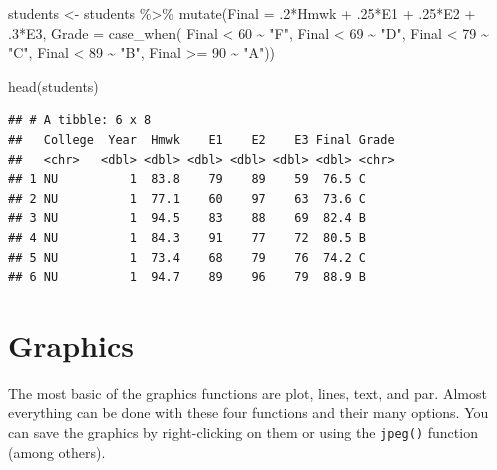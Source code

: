 \documentclass[
]{book}
\newenvironment{Shaded}{\begin{snugshade}}{\end{snugshade}}
\newcommand{\AttributeTok}[1]{\textcolor[rgb]{0.77,0.63,0.00}{#1}}
\newcommand{\DecValTok}[1]{\textcolor[rgb]{0.00,0.00,0.81}{#1}}
\newcommand{\FunctionTok}[1]{\textcolor[rgb]{0.00,0.00,0.00}{#1}}
\newcommand{\NormalTok}[1]{#1}
\newcommand{\OtherTok}[1]{\textcolor[rgb]{0.56,0.35,0.01}{#1}}
\newcommand{\SpecialCharTok}[1]{\textcolor[rgb]{0.00,0.00,0.00}{#1}}
\newcommand{\StringTok}[1]{\textcolor[rgb]{0.31,0.60,0.02}{#1}}
\begin{document}
\begin{Shaded}
\begin{Highlighting}[]
\NormalTok{students }\OtherTok{\textless{}{-}}\NormalTok{ students }\SpecialCharTok{\%\textgreater{}\%} 
  \FunctionTok{mutate}\NormalTok{(}\AttributeTok{Final =}\NormalTok{ .}\DecValTok{2}\SpecialCharTok{*}\NormalTok{Hmwk }\SpecialCharTok{+}\NormalTok{ .}\DecValTok{25}\SpecialCharTok{*}\NormalTok{E1 }\SpecialCharTok{+}\NormalTok{ .}\DecValTok{25}\SpecialCharTok{*}\NormalTok{E2 }\SpecialCharTok{+}\NormalTok{ .}\DecValTok{3}\SpecialCharTok{*}\NormalTok{E3,}
         \AttributeTok{Grade =} \FunctionTok{case\_when}\NormalTok{(}
\NormalTok{           Final }\SpecialCharTok{\textless{}} \DecValTok{60} \SpecialCharTok{\textasciitilde{}} \StringTok{"F"}\NormalTok{,}
\NormalTok{           Final }\SpecialCharTok{\textless{}} \DecValTok{69} \SpecialCharTok{\textasciitilde{}} \StringTok{"D"}\NormalTok{,}
\NormalTok{           Final }\SpecialCharTok{\textless{}} \DecValTok{79} \SpecialCharTok{\textasciitilde{}} \StringTok{"C"}\NormalTok{,}
\NormalTok{           Final }\SpecialCharTok{\textless{}} \DecValTok{89} \SpecialCharTok{\textasciitilde{}} \StringTok{"B"}\NormalTok{,}
\NormalTok{           Final }\SpecialCharTok{\textgreater{}=} \DecValTok{90} \SpecialCharTok{\textasciitilde{}} \StringTok{"A"}\NormalTok{))}

\FunctionTok{head}\NormalTok{(students)}
\end{Highlighting}
\end{Shaded}

\begin{verbatim}
## # A tibble: 6 x 8
##   College  Year  Hmwk    E1    E2    E3 Final Grade
##   <chr>   <dbl> <dbl> <dbl> <dbl> <dbl> <dbl> <chr>
## 1 NU          1  83.8    79    89    59  76.5 C    
## 2 NU          1  77.1    60    97    63  73.6 C    
## 3 NU          1  94.5    83    88    69  82.4 B    
## 4 NU          1  84.3    91    77    72  80.5 B    
## 5 NU          1  73.4    68    79    76  74.2 C    
## 6 NU          1  94.7    89    96    79  88.9 B
\end{verbatim}

\hypertarget{graphics}{%
\chapter{Graphics}\label{graphics}}

The most basic of the graphics functions are plot, lines, text, and par. Almost everything can be done with these four functions and their many options. You can save the graphics by right-clicking on them or using the \texttt{jpeg()} function (among others).
\end{document}
